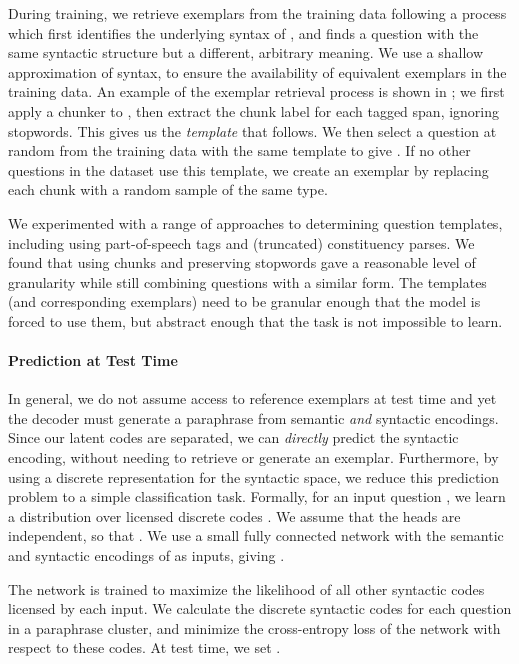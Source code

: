 \documentclass[11pt,a4paper]{article}
\begin{document}
During training, we retrieve exemplars  from the
training data following a process which first identifies the
underlying syntax of , and finds a question with the same
syntactic structure but a different, arbitrary meaning. We use a
shallow approximation of syntax, to ensure the availability of
equivalent exemplars in the training data. An example of the exemplar
retrieval process is shown in ; we first
apply a chunker \citep[FlairNLP, ][]{akbik-etal-2018-contextual} to
, then extract the chunk label for each tagged span,
ignoring stopwords. This gives us the \textit{template} that
 follows. We then select a question at random from the
training data with the same template to give . If no
other questions in the dataset use this template, we create an exemplar by replacing each chunk with a random sample of the same type.



We experimented with a range of approaches to determining question
templates, including using part-of-speech tags and (truncated)
constituency parses. We found that using chunks and preserving
stopwords gave a reasonable level of granularity while still combining
questions with a similar form. The templates (and corresponding
exemplars) need to be granular enough that the model is forced to use
them, but abstract enough that the task is not impossible to learn.

\paragraph{Prediction at Test Time}
\label{sec:mlp}




In general, we do not assume access to reference exemplars at test
time and yet the decoder must generate a paraphrase from semantic
\emph{and} syntactic encodings.  Since our latent codes are separated,
we can \emph{directly} predict the syntactic encoding, without needing
to retrieve or generate an exemplar. Furthermore, by using a discrete
representation for the syntactic space, we reduce this prediction
problem to a simple classification task. Formally, for an input
question , we learn a distribution over licensed discrete
codes . We assume that the heads are
independent, so that . We use a small fully connected network with the semantic and
syntactic encodings of  as inputs, giving .

The network is trained to maximize the likelihood of all other
syntactic codes licensed by each input. We calculate the discrete
syntactic codes for each question in a paraphrase cluster, and
minimize the cross-entropy loss of the network with respect to these
codes. At test time, we set .
\end{document}
